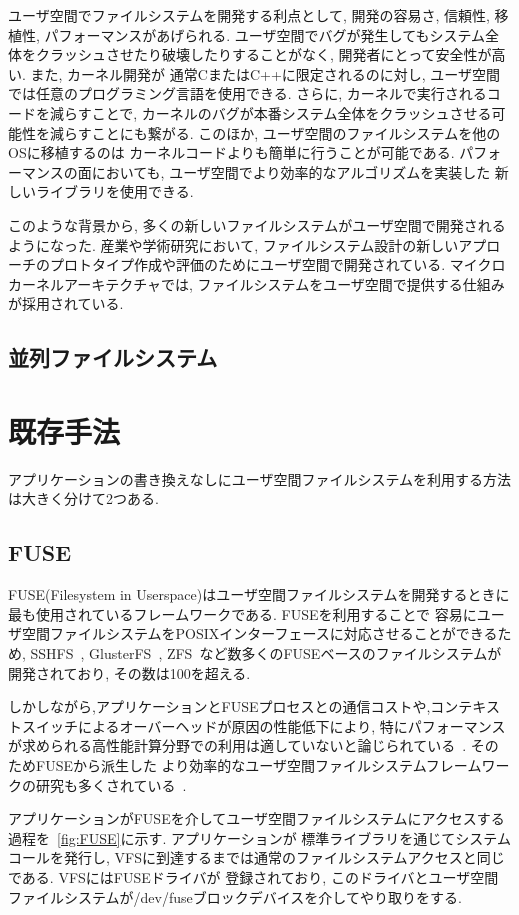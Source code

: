 \documentclass[a4paper,11pt]{jreport}
\begin{document}
ユーザ空間でファイルシステムを開発する利点として, 開発の容易さ, 信頼性, 移植性, パフォーマンスがあげられる. 
ユーザ空間でバグが発生してもシステム全体をクラッシュさせたり破壊したりすることがなく, 開発者にとって安全性が高い. また, カーネル開発が
通常CまたはC++に限定されるのに対し, ユーザ空間では任意のプログラミング言語を使用できる. さらに, カーネルで実行されるコードを減らすことで, 
カーネルのバグが本番システム全体をクラッシュさせる可能性を減らすことにも繋がる. このほか, ユーザ空間のファイルシステムを他のOSに移植するのは
カーネルコードよりも簡単に行うことが可能である. パフォーマンスの面においても, ユーザ空間でより効率的なアルゴリズムを実装した
新しいライブラリを使用できる. 

このような背景から, 多くの新しいファイルシステムがユーザ空間で開発されるようになった.
産業や学術研究において, ファイルシステム設計の新しいアプローチのプロトタイプ作成や評価のためにユーザ空間で開発されている. 
マイクロカーネルアーキテクチャでは, ファイルシステムをユーザ空間で提供する仕組みが採用されている. 
\section{並列ファイルシステム}



\chapter{既存手法}
アプリケーションの書き換えなしにユーザ空間ファイルシステムを利用する方法は大きく分けて2つある.
\section{FUSE}
FUSE(Filesystem in Userspace)はユーザ空間ファイルシステムを開発するときに最も使用されているフレームワークである. FUSEを利用することで
容易にユーザ空間ファイルシステムをPOSIXインターフェースに対応させることができるため, SSHFS~\cite{hoskins2006sshfs}, GlusterFS~\cite{davies2013scale}, 
ZFS~\cite{rodeh2003zfs}など数多くのFUSEベースのファイルシステムが開発されており, その数は100を超える.

しかしながら,アプリケーションとFUSEプロセスとの通信コストや,コンテキストスイッチによるオーバーヘッドが原因の性能低下により, 
特にパフォーマンスが求められる高性能計算分野での利用は適していないと論じられている~\cite{brinkmann2020ad}. そのためFUSEから派生した
より効率的なユーザ空間ファイルシステムフレームワークの研究も多くされている~\cite{294791, zhu2018direct, 3494556}. 

アプリケーションがFUSEを介してユーザ空間ファイルシステムにアクセスする過程を\figurename~\ref{fig:FUSE}に示す. アプリケーションが
標準ライブラリを通じてシステムコールを発行し, VFSに到達するまでは通常のファイルシステムアクセスと同じである. VFSにはFUSEドライバが
登録されており, このドライバとユーザ空間ファイルシステムが/dev/fuseブロックデバイスを介してやり取りをする.
\end{document}
